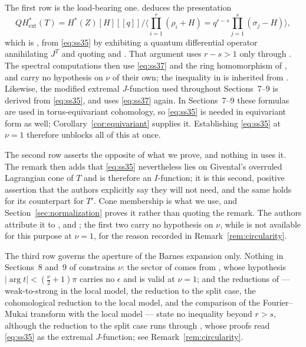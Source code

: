 The first row is the load-bearing one.  \cite[Theorem~4.6]{SS} deduces the
presentation
\begin{equation}
  \label{eq:ss37}
  QH^{*}_{\mathrm{ext}}(T)
  =H^{*}(Z)[H][[q]]\Big/\Big\langle\textstyle\prod_{i=1}^{r}(\rho_{i}+H)
    =q^{r-s}\prod_{j=1}^{s}(\sigma_{j}-H)\Big\rangle,
\end{equation}
which is \cite[(37)]{SS}, from \eqref{eq:ss35} by exhibiting a quantum
differential operator annihilating \(J^{T}\) and quoting
\cite[Theorem~10.3.1]{CoxKatz} and \cite[Lemma~2]{Pandharipande}.  That
argument uses \(r-s>1\) only through \cite[Theorem~4.4]{SS}.  The spectral
computations \cite[Propositions~5.1 and~5.2, Corollary~5.3]{SS} then use
\eqref{eq:ss37} and the ring homomorphism of \cite[Theorem~3.3]{SS}, and
carry no hypothesis on \(\nu\) of their own; the inequality in
\cite[Theorem~1.2]{SS} is inherited from \cite[Theorem~4.4]{SS}.  Likewise,
the modified extremal \(J\)-function \cite[(40)]{SS} used throughout
Sections~7--9 is derived from \eqref{eq:ss35}, and \cite[Proposition~9.1]{SS}
uses \eqref{eq:ss37} again.  In Sections~7--9 these formulas are used in
torus-equivariant cohomology, so \eqref{eq:ss35} is needed in equivariant
form as well; Corollary~\ref{cor:equivariant} supplies it.  Establishing
\eqref{eq:ss35} at \(\nu=1\) therefore unblocks all of this at once.

The second row asserts the opposite of what we prove, and nothing in
\cite{SS} uses it.  The remark then adds that \eqref{eq:ss35} nevertheless
lies on Givental's overruled Lagrangian cone of \(T\) and is therefore an
\(I\)-function; it is this second, positive assertion that the authors
explicitly say they will not need, and the same holds for its counterpart
\cite[Remark~4.7]{SS} for \(T'\).  Cone membership is what we use, and
Section~\ref{sec:normalization} proves it rather than quoting the remark.
The authors attribute it to \cite{Brown}, \cite{CoatesGivental} and
\cite[Lemma~9.6]{SS}; the first two carry no hypothesis on \(\nu\), while
\cite[Lemma~9.6]{SS} is not available for this purpose at \(\nu=1\), for the
reason recorded in Remark~\ref{rem:circularity}.

The third row governs the aperture of the Barnes expansion only.  Nothing in
Sections~8 and~9 of \cite{SS} constrains \(\nu\): the sector
\cite[(78)]{SS} of \cite[Proposition~8.2]{SS} comes from
\cite[Theorem~A.2]{SS}, whose hypothesis \(|\arg t|<(\tfrac{\nu}{2}+1)\pi\)
carries no \(\epsilon\) and is valid at \(\nu=1\); and the reductions of
\cite[Sections~9.1--9.4]{SS} --- weak-to-strong in the local model, the
reduction to the split case, the cohomological reduction to the local model,
and the comparison of the Fourier--Mukai transform with the local model ---
state no inequality beyond \(r>s\), although the reduction to the split case
runs through \cite[Lemmas~9.4--9.6]{SS}, whose proofs read \eqref{eq:ss35} as
the extremal \(J\)-function; see Remark~\ref{rem:circularity}.
